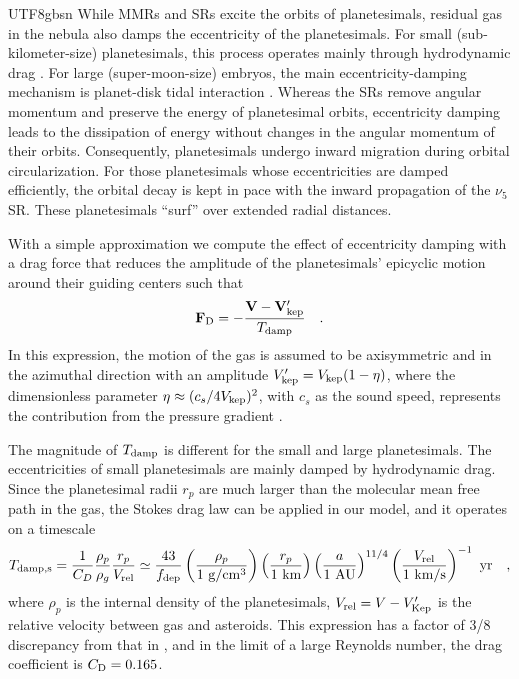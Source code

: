 \documentclass[tighten]{aastex6}
\begin{document}
\begin{CJK*}{UTF8}{gbsn}
While MMRs and SRs excite the orbits of planetesimals, 
residual gas in the nebula also damps the eccentricity 
of the planetesimals. For small 
(sub-kilometer-size) planetesimals, this process operates mainly through
hydrodynamic drag \citep{adachi1976}. For large (super-moon-size) 
embryos, the main eccentricity-damping mechanism is planet-disk 
tidal interaction \citep{goldreichtremaine1980, ward1997}.  
Whereas the SRs remove angular momentum and preserve 
the energy of planetesimal orbits, eccentricity damping 
leads to the dissipation of energy without changes in the 
angular momentum of their orbits.  Consequently, planetesimals 
undergo inward migration during orbital circularization.
For those planetesimals whose eccentricities are damped efficiently, 
the orbital decay is kept in pace with the inward propagation 
of the $\nu_5$ SR.  These planetesimals ``surf'' 
over extended radial distances.  


With a simple approximation \citep{zhou2007} 
we compute the effect of eccentricity damping with a drag force
that reduces the amplitude of the planetesimals' epicyclic motion
around their guiding centers such that
%
\begin{equation}
{\bf F}_{\rm D} = - \frac{{\bf V} - {\bf V}_{\rm kep}^{\prime}}
{T_{\rm damp}} \quad .
\label{eq:dragforce}
\end{equation}
%
In this expression, the motion of the gas is assumed to be axisymmetric 
and in the azimuthal direction with an amplitude $V_{\rm kep}^{\prime} 
= V_{\rm kep}(1-\eta)$, where the dimensionless parameter 
$\eta \approx (c_s/4V_{\rm kep})^2$, with $c_s$ as the sound 
speed, represents the contribution from the
pressure gradient \citep{adachi1976}.

The magnitude of $T_{\rm damp}$ is different for the small and large
planetesimals.  The eccentricities of small planetesimals are mainly damped by hydrodynamic drag. Since the planetesimal radii $r_p$  are much larger than 
the molecular mean free path in the gas, the Stokes drag law 
\citep{whipple1972, adachi1976, weidenschilling1977, ida1996, 
supulver2000} can be applied in our model, and it operates on a timescale
%
\begin{eqnarray} 
T_{\rm damp,s} = \frac{1}{C_D} \frac{\rho_{p}}{\rho_{g}} 
\frac{r_{p}}{ V_{\rm rel}} 
\simeq {43 \over f_{\rm dep}}
             \left(\frac{\rho_{p}} {1~{\rm g}/{\rm cm}^{3}}\right) 
             \left(\frac{r_p} {1~{\rm km}} \right) 
             \left(\frac{a} {1~{\rm AU}}\right)^{11/4} 
             \left(\frac{V_{\rm rel}}{1~{\rm km/s}}\right)^{-1} 
             {\ \rm yr} \quad  ,
\label{eq:t1}
\end{eqnarray}
%
where $\rho_p$ is the internal density of the planetesimals, $V_{\rm rel}= 
V - V_{\rm Kep}^{\prime}$ is the relative velocity between gas and asteroids.  
This expression has a factor of 3/8 discrepancy from that in \cite{whipple1972}, 
and in the limit of a large Reynolds number, the drag coefficient is $C_{\rm D} = 0.165$.  


\end{CJK*}
\end{document}
